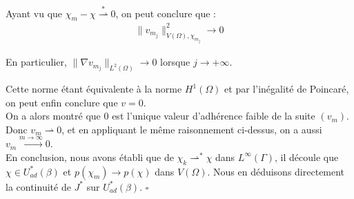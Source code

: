 Ayant vu que $\chi_m - \chi \stackrel{\ast}{\rightharpoonup}0$, on peut conclure que :
\begin{equation}
\begin{aligned}
\lVert v_{m_j} \rVert^2_{V(\Omega),\chi_{m_j}} \longrightarrow 0
\end{aligned}
\end{equation}

En particulier, $\|\nabla v_{m_j}\|_{L^2(\Omega)} \to 0$ lorsque $j \to +\infty$.

Cette norme étant équivalente à la norme $H^1(\Omega)$ et par l'inégalité de Poincaré, on peut enfin conclure que $v = 0$.\\

On a alors montré que $0$ est l'unique valeur d'adhérence faible de la suite $(v_m)$. Donc $v_m\rightharpoonup 0$, et en appliquant le même raisonnement ci-dessus, on a aussi $v_m\xrightarrow{m\to \infty} 0$.\\

En conclusion, nous avons établi que de $\chi_k \rightharpoonup^* \chi$ dans $L^\infty(\Gamma)$, il découle que $\chi \in U_{ad}^*(\beta)$ et $p(\chi_m) \longrightarrow p(\chi)$ dans $V(\Omega)$. Nous en déduisons directement la continuité de $J^*$ sur $U_{ad}^*(\beta)$. $\square$